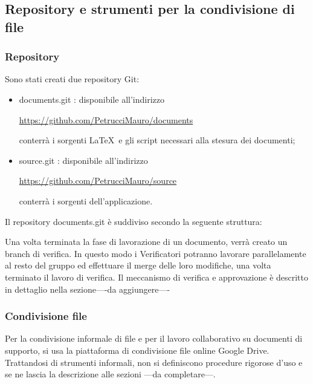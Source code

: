 \subsection{Repository e strumenti per la condivisione di file}

\subsubsection{Repository}
Sono stati creati due repository  Git:
\begin{itemize}


\item documents.git  : disponibile all’indirizzo\\
\begin{center}\url{https://github.com/PetrucciMauro/documents}\\\end{center}
conterrà i sorgenti \LaTeX \ e gli script necessari alla stesura dei documenti;
\item source.git : disponibile all’indirizzo\\
\begin{center}
\url{https://github.com/PetrucciMauro/source}\\
\end{center}
conterrà i sorgenti dell’applicazione.\\
\end{itemize}
Il repository  documents.git è suddiviso secondo la seguente struttura:


Una volta terminata la fase di lavorazione di un documento, verrà creato un branch di verifica. In questo modo i Verificatori potranno lavorare parallelamente al resto del gruppo ed effettuare il merge  delle loro modifiche, una volta terminato il lavoro di verifica.
Il meccanismo di verifica e approvazione è descritto in dettaglio nella sezione----da aggiungere----


\subsubsection{Condivisione file}
Per la condivisione informale di file e per il lavoro collaborativo su documenti di supporto, si usa la piattaforma di condivisione file online Google Drive.
Trattandosi di strumenti informali, non si definiscono procedure rigorose d’uso e se ne lascia la descrizione alle sezioni ---da completare---.